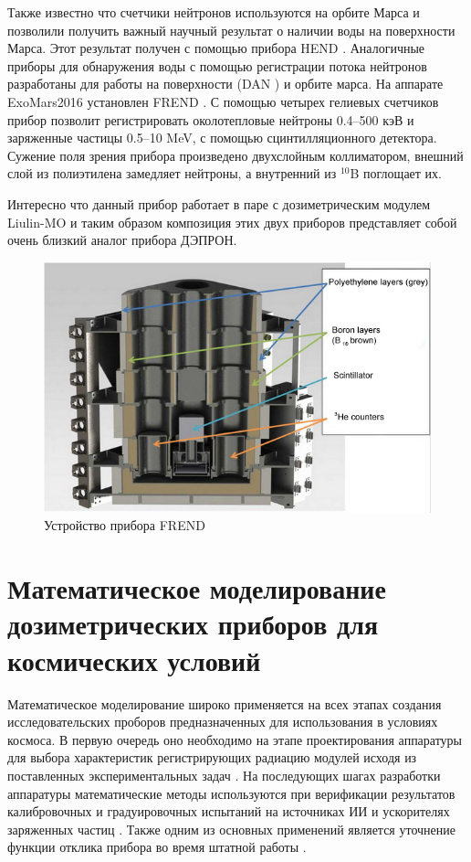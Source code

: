 Также известно что счетчики нейтронов используются на орбите Марса и позволили получить важный научный результат о наличии воды на поверхности Марса.  Этот  результат получен с помощью прибора HEND \cite{Feldman2004}. Аналогичные приборы для обнаружения воды с помощью регистрации потока нейтронов разработаны для работы на поверхности (DAN \cite{Mitrofanov2012a}) и орбите марса. На аппарате ExoMars2016 установлен FREND \cite{Mitrofanov2012}. С помощью четырех гелиевых счетчиков прибор позволит регистрировать околотепловые нейтроны 0.4–500 кэВ и заряженные частицы 0.5–10 MeV, с помощью сцинтилляционного детектора. Сужение поля зрения прибора произведено двухслойным коллиматором, внешний слой из полиэтилена замедляет нейтроны, а внутренний из $ ^10 $B поглощает их. 

Интересно что данный прибор работает в паре с дозиметрическим модулем Liulin-MO и таким образом композиция этих двух приборов представляет собой очень близкий аналог прибора ДЭПРОН.
\begin{figure}
	\centering
	\includegraphics[width=0.7\linewidth]{images/frend3-eng}
	\caption{Устройство прибора FREND \cite{Mitrofanov2012}}
	\label{fig:frend3-eng}
\end{figure}

\section{Математическое моделирование дозиметрических приборов для космических условий}

Математическое моделирование широко применяется на всех этапах создания исследовательских проборов предназначенных для использования в условиях космоса. В первую очередь оно необходимо на этапе проектирования аппаратуры для выбора характеристик регистрирующих радиацию модулей исходя из поставленных экспериментальных задач \cite{Hassler2008}. На последующих шагах разработки аппаратуры математические методы используются при верификации результатов калибровочных и градуировочных испытаний на источниках ИИ и ускорителях заряженных частиц \cite{Zeitlin2010, Luszik-Bhadra2008} . Также одним из основных применений является уточнение функции отклика прибора во время штатной работы \cite{Zeitlin2010}. 


